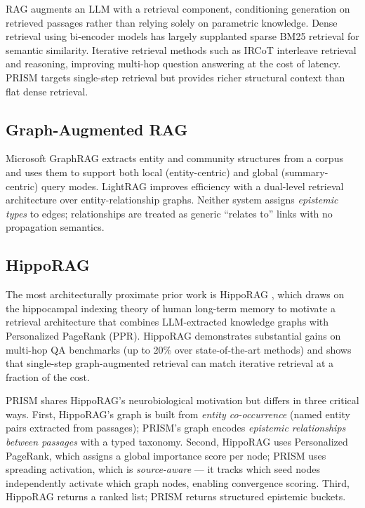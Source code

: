 \documentclass[11pt,a4paper]{article}
\begin{document}
RAG \citep{lewis2020rag} augments an LLM with a retrieval component,
conditioning generation on retrieved passages rather than relying solely on
parametric knowledge. Dense retrieval using bi-encoder models
\citep{karpukhin2020dpr} has largely supplanted sparse BM25 retrieval for
semantic similarity. Iterative retrieval methods such as IRCoT
\citep{trivedi2022ircot} interleave retrieval and reasoning, improving
multi-hop question answering at the cost of latency. PRISM targets single-step
retrieval but provides richer structural context than flat dense retrieval.

\subsection{Graph-Augmented RAG}

Microsoft GraphRAG \citep{edge2024graphrag} extracts entity and community
structures from a corpus and uses them to support both local (entity-centric)
and global (summary-centric) query modes. LightRAG \citep{guo2024lightrag}
improves efficiency with a dual-level retrieval architecture over
entity-relationship graphs. Neither system assigns \emph{epistemic types}
to edges; relationships are treated as generic \enquote{relates to} links with
no propagation semantics.

\subsection{HippoRAG}

The most architecturally proximate prior work is HippoRAG
\citep{gutierrez2024hipporag}, which draws on the hippocampal indexing theory
of human long-term memory \citep{teyler1986hippocampal} to motivate a
retrieval architecture that combines LLM-extracted knowledge graphs with
Personalized PageRank (PPR). HippoRAG demonstrates substantial gains on
multi-hop QA benchmarks (up to 20\% over state-of-the-art methods) and
shows that single-step graph-augmented retrieval can match iterative retrieval
at a fraction of the cost.

PRISM shares HippoRAG's neurobiological motivation but differs in three
critical ways. First, HippoRAG's graph is built from \emph{entity co-occurrence}
(named entity pairs extracted from passages); PRISM's graph encodes
\emph{epistemic relationships between passages} with a typed taxonomy.
Second, HippoRAG uses Personalized PageRank, which assigns a global importance
score per node; PRISM uses spreading activation, which is
\emph{source-aware} — it tracks which seed nodes independently activate which
graph nodes, enabling convergence scoring. Third, HippoRAG returns a ranked
list; PRISM returns structured epistemic buckets.
\end{document}
